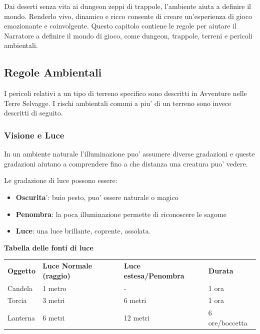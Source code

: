 \documentclass[a4paper,11pt,twoside,openany]{book}
\begin{document}
{		Dai deserti senza vita ai dungeon zeppi di trappole, l'ambiente aiuta a definire il mondo. Renderlo vivo, dinamico e ricco consente di creare un'esperienza di gioco emozionante e coinvolgente. Questo capitolo contiene le regole per aiutare il Narratore a definire il mondo di gioco, come dungeon, trappole, terreni e pericoli ambientali.
		
		\subsection{Regole Ambientali}
		
		\label{regole-ambientali}
		
		I pericoli relativi a un tipo di terreno specifico sono descritti in Avventure nelle Terre Selvagge. I rischi ambientali comuni a piu' di un terreno sono invece descritti di seguito.
		
		\subsubsection{Visione e Luce}
		
		\label{visione-e-luce}
		
		In un ambiente naturale l'illuminazione puo' assumere diverse gradazioni e queste gradazioni aiutano a comprendere fino a che distanza una creatura puo' vedere.
		
		Le gradazione di luce possono essere:
		\begin{itemize}
			\item 
			\textbf{Oscurita}': buio pesto, puo' essere naturale o magico 
			\item 
			\textbf{Penombra}: la poca illuminazione permette di riconoscere le
			sagome 
			\item 
			\textbf{Luce}: una luce brillante, coprente, assolata. 
		\end{itemize}
		
		\medskip
		
		\textbf{Tabella delle fonti di luce}
		
		\medskip
		
		
		\begin{tabular}{llll}
			\toprule
			\textbf{Oggetto} & \textbf{Luce Normale (raggio)} & \textbf{Luce estesa/Penombra} & \textbf{Durata}\tabularnewline
			Candela & 1 metro & - & 1 ora\tabularnewline
			Torcia & 3 metri & 6 metri & 1 ora\tabularnewline
			Lanterna & 6 metri & 12 metri & 6 ore/boccetta\tabularnewline
		\end{tabular}
		
}
\end{document}
